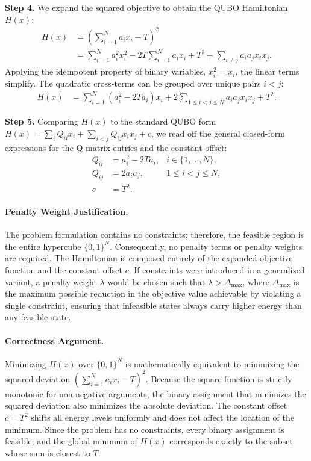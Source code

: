 \documentclass[12pt]{article}
\begin{document}
\textbf{Step 4.} We expand the squared objective to obtain the QUBO Hamiltonian $H(x)$:
\begin{align}
H(x) &= \left( \sum_{i=1}^{N} a_i x_i - T \right)^2 \\
&= \sum_{i=1}^{N} a_i^2 x_i^2 - 2T \sum_{i=1}^{N} a_i x_i + T^2 + \sum_{i \neq j} a_i a_j x_i x_j.
\end{align}
Applying the idempotent property of binary variables, $x_i^2 = x_i$, the linear terms simplify. The quadratic cross-terms can be grouped over unique pairs $i < j$:
\begin{align}
H(x) &= \sum_{i=1}^{N} (a_i^2 - 2T a_i) x_i + 2 \sum_{1 \leq i < j \leq N} a_i a_j x_i x_j + T^2.
\end{align}

\textbf{Step 5.} Comparing $H(x)$ to the standard QUBO form $H(x) = \sum_{i} Q_{ii} x_i + \sum_{i < j} Q_{ij} x_i x_j + c$, we read off the general closed-form expressions for the Q matrix entries and the constant offset:
\begin{align}
Q_{ii} &= a_i^2 - 2T a_i, & i \in \{1, \dots, N\}, \\
Q_{ij} &= 2 a_i a_j, & 1 \leq i < j \leq N, \\
c &= T^2. &
\end{align}

\paragraph{Penalty Weight Justification.}
The problem formulation contains no constraints; therefore, the feasible region is the entire hypercube $\{0,1\}^N$. Consequently, no penalty terms or penalty weights are required. The Hamiltonian is composed entirely of the expanded objective function and the constant offset $c$. If constraints were introduced in a generalized variant, a penalty weight $\lambda$ would be chosen such that $\lambda > \Delta_{\text{max}}$, where $\Delta_{\text{max}}$ is the maximum possible reduction in the objective value achievable by violating a single constraint, ensuring that infeasible states always carry higher energy than any feasible state.

\paragraph{Correctness Argument.}
Minimizing $H(x)$ over $\{0,1\}^N$ is mathematically equivalent to minimizing the squared deviation $(\sum_{i=1}^{N} a_i x_i - T)^2$. Because the square function is strictly monotonic for non-negative arguments, the binary assignment that minimizes the squared deviation also minimizes the absolute deviation. The constant offset $c = T^2$ shifts all energy levels uniformly and does not affect the location of the minimum. Since the problem has no constraints, every binary assignment is feasible, and the global minimum of $H(x)$ corresponds exactly to the subset whose sum is closest to $T$.
\end{document}
